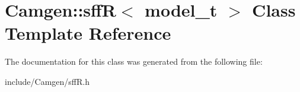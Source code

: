\hypertarget{a00508}{}\section{Camgen\+:\+:sff\+R$<$ model\+\_\+t $>$ Class Template Reference}
\label{a00508}


The documentation for this class was generated from the following file\+:\begin{DoxyCompactItemize}
\item 
include/\+Camgen/sff\+R.\+h\end{DoxyCompactItemize}
